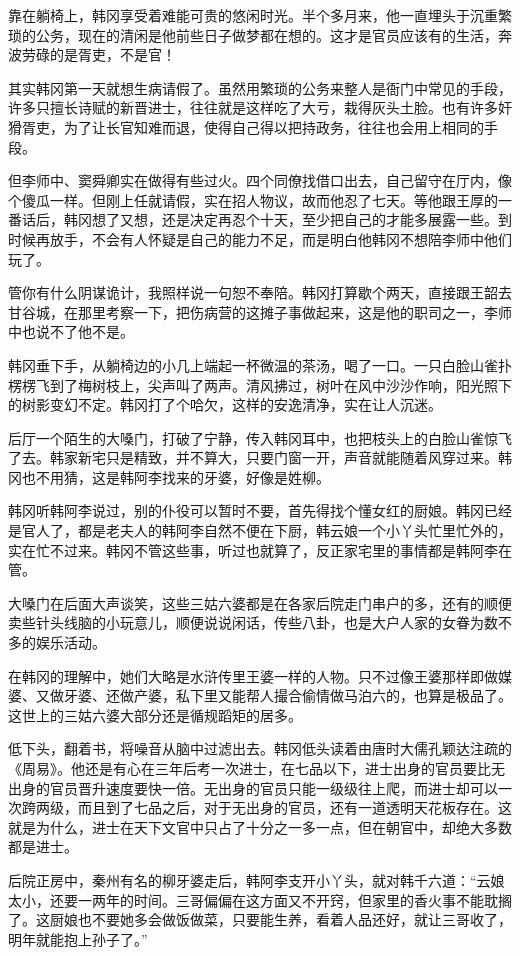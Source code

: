 靠在躺椅上，韩冈享受着难能可贵的悠闲时光。半个多月来，他一直埋头于沉重繁琐的公务，现在的清闲是他前些日子做梦都在想的。这才是官员应该有的生活，奔波劳碌的是胥吏，不是官！

其实韩冈第一天就想生病请假了。虽然用繁琐的公务来整人是衙门中常见的手段，许多只擅长诗赋的新晋进士，往往就是这样吃了大亏，栽得灰头土脸。也有许多奸猾胥吏，为了让长官知难而退，使得自己得以把持政务，往往也会用上相同的手段。

但李师中、窦舜卿实在做得有些过火。四个同僚找借口出去，自己留守在厅内，像个傻瓜一样。但刚上任就请假，实在招人物议，故而他忍了七天。等他跟王厚的一番话后，韩冈想了又想，还是决定再忍个十天，至少把自己的才能多展露一些。到时候再放手，不会有人怀疑是自己的能力不足，而是明白他韩冈不想陪李师中他们玩了。

管你有什么阴谋诡计，我照样说一句恕不奉陪。韩冈打算歇个两天，直接跟王韶去甘谷城，在那里考察一下，把伤病营的这摊子事做起来，这是他的职司之一，李师中也说不了他不是。

韩冈垂下手，从躺椅边的小几上端起一杯微温的茶汤，喝了一口。一只白脸山雀扑楞楞飞到了梅树枝上，尖声叫了两声。清风拂过，树叶在风中沙沙作响，阳光照下的树影变幻不定。韩冈打了个哈欠，这样的安逸清净，实在让人沉迷。

后厅一个陌生的大嗓门，打破了宁静，传入韩冈耳中，也把枝头上的白脸山雀惊飞了去。韩家新宅只是精致，并不算大，只要门窗一开，声音就能随着风穿过来。韩冈也不用猜，这是韩阿李找来的牙婆，好像是姓柳。

韩冈听韩阿李说过，别的仆役可以暂时不要，首先得找个懂女红的厨娘。韩冈已经是官人了，都是老夫人的韩阿李自然不便在下厨，韩云娘一个小丫头忙里忙外的，实在忙不过来。韩冈不管这些事，听过也就算了，反正家宅里的事情都是韩阿李在管。

大嗓门在后面大声谈笑，这些三姑六婆都是在各家后院走门串户的多，还有的顺便卖些针头线脑的小玩意儿，顺便说说闲话，传些八卦，也是大户人家的女眷为数不多的娱乐活动。

在韩冈的理解中，她们大略是水浒传里王婆一样的人物。只不过像王婆那样即做媒婆、又做牙婆、还做产婆，私下里又能帮人撮合偷情做马泊六的，也算是极品了。这世上的三姑六婆大部分还是循规蹈矩的居多。

低下头，翻着书，将噪音从脑中过滤出去。韩冈低头读着由唐时大儒孔颖达注疏的《周易》。他还是有心在三年后考一次进士，在七品以下，进士出身的官员要比无出身的官员晋升速度要快一倍。无出身的官员只能一级级往上爬，而进士却可以一次跨两级，而且到了七品之后，对于无出身的官员，还有一道透明天花板存在。这就是为什么，进士在天下文官中只占了十分之一多一点，但在朝官中，却绝大多数都是进士。

后院正房中，秦州有名的柳牙婆走后，韩阿李支开小丫头，就对韩千六道：“云娘太小，还要一两年的时间。三哥偏偏在这方面又不开窍，但家里的香火事不能耽搁了。这厨娘也不要她多会做饭做菜，只要能生养，看着人品还好，就让三哥收了，明年就能抱上孙子了。”

